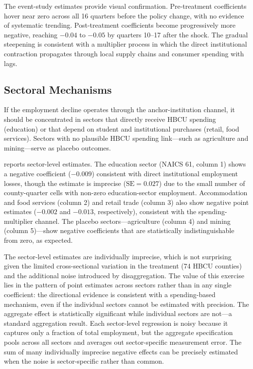 \documentclass[12pt]{article}
\begin{document}
The event-study estimates provide visual confirmation. Pre-treatment coefficients hover near zero across all 16 quarters before the policy change, with no evidence of systematic trending. Post-treatment coefficients become progressively more negative, reaching $-0.04$ to $-0.05$ by quarters 10--17 after the shock. The gradual steepening is consistent with a multiplier process in which the direct institutional contraction propagates through local supply chains and consumer spending with lags.



\subsection{Sectoral Mechanisms}

If the employment decline operates through the anchor-institution channel, it should be concentrated in sectors that directly receive HBCU spending (education) or that depend on student and institutional purchases (retail, food services). Sectors with no plausible HBCU spending link---such as agriculture and mining---serve as placebo outcomes.

 reports sector-level estimates. The education sector (NAICS 61, column 1) shows a negative coefficient ($-0.009$) consistent with direct institutional employment losses, though the estimate is imprecise ($\text{SE} = 0.027$) due to the small number of county-quarter cells with non-zero education-sector employment. Accommodation and food services (column 2) and retail trade (column 3) also show negative point estimates ($-0.002$ and $-0.013$, respectively), consistent with the spending-multiplier channel. The placebo sectors---agriculture (column 4) and mining (column 5)---show negative coefficients that are statistically indistinguishable from zero, as expected.

The sector-level estimates are individually imprecise, which is not surprising given the limited cross-sectional variation in the treatment (74 HBCU counties) and the additional noise introduced by disaggregation. The value of this exercise lies in the pattern of point estimates across sectors rather than in any single coefficient: the directional evidence is consistent with a spending-based mechanism, even if the individual sectors cannot be estimated with precision. The aggregate effect is statistically significant while individual sectors are not---a standard aggregation result. Each sector-level regression is noisy because it captures only a fraction of total employment, but the aggregate specification pools across all sectors and averages out sector-specific measurement error. The sum of many individually imprecise negative effects can be precisely estimated when the noise is sector-specific rather than common.
\end{document}
